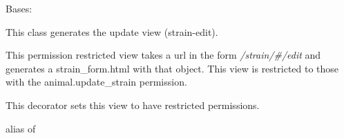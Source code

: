 \documentclass[letterpaper,10pt,english]{sphinxmanual}
\begin{document}

\begin{fulllineitems}
\label{api:mousedb.animal.views.StrainUpdate}
Bases: \href{http://docs.djangoproject.com/en/dev/ref/class-based-views/\#django.views.generic.edit.UpdateView}{}

This class generates the update {\hyperref[api:mousedb.animal.models.Strain]{}} view (strain-edit).

This permission restricted view takes a url in the form \emph{/strain/\#/edit} and generates a strain\_form.html with that object.
This view is restricted to those with the animal.update\_strain permission.

\begin{fulllineitems}
\label{api:mousedb.animal.views.StrainUpdate.context_object_name}
\end{fulllineitems}


\begin{fulllineitems}
\label{api:mousedb.animal.views.StrainUpdate.dispatch}
This decorator sets this view to have restricted permissions.

\end{fulllineitems}


\begin{fulllineitems}
\label{api:mousedb.animal.views.StrainUpdate.model}
alias of 

\end{fulllineitems}


\begin{fulllineitems}
\label{api:mousedb.animal.views.StrainUpdate.template_name}
\end{fulllineitems}


\end{fulllineitems}
\end{document}
